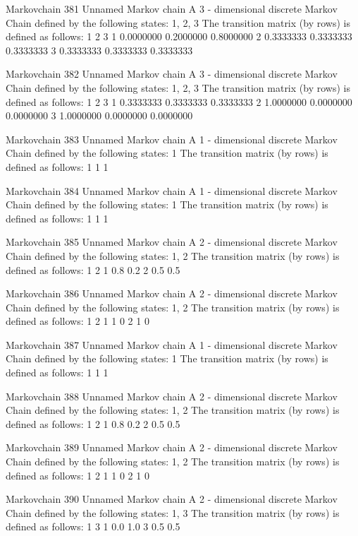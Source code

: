 \documentclass[
  nojss]{jss}
\begin{document}
\begin{CodeChunk}
\begin{CodeOutput}
Markovchain  381 
Unnamed Markov chain 
 A  3 - dimensional discrete Markov Chain defined by the following states: 
 1, 2, 3 
 The transition matrix  (by rows)  is defined as follows: 
          1         2         3
1 0.0000000 0.2000000 0.8000000
2 0.3333333 0.3333333 0.3333333
3 0.3333333 0.3333333 0.3333333

Markovchain  382 
Unnamed Markov chain 
 A  3 - dimensional discrete Markov Chain defined by the following states: 
 1, 2, 3 
 The transition matrix  (by rows)  is defined as follows: 
          1         2         3
1 0.3333333 0.3333333 0.3333333
2 1.0000000 0.0000000 0.0000000
3 1.0000000 0.0000000 0.0000000

Markovchain  383 
Unnamed Markov chain 
 A  1 - dimensional discrete Markov Chain defined by the following states: 
 1 
 The transition matrix  (by rows)  is defined as follows: 
  1
1 1

Markovchain  384 
Unnamed Markov chain 
 A  1 - dimensional discrete Markov Chain defined by the following states: 
 1 
 The transition matrix  (by rows)  is defined as follows: 
  1
1 1

Markovchain  385 
Unnamed Markov chain 
 A  2 - dimensional discrete Markov Chain defined by the following states: 
 1, 2 
 The transition matrix  (by rows)  is defined as follows: 
    1   2
1 0.8 0.2
2 0.5 0.5

Markovchain  386 
Unnamed Markov chain 
 A  2 - dimensional discrete Markov Chain defined by the following states: 
 1, 2 
 The transition matrix  (by rows)  is defined as follows: 
  1 2
1 1 0
2 1 0

Markovchain  387 
Unnamed Markov chain 
 A  1 - dimensional discrete Markov Chain defined by the following states: 
 1 
 The transition matrix  (by rows)  is defined as follows: 
  1
1 1

Markovchain  388 
Unnamed Markov chain 
 A  2 - dimensional discrete Markov Chain defined by the following states: 
 1, 2 
 The transition matrix  (by rows)  is defined as follows: 
    1   2
1 0.8 0.2
2 0.5 0.5

Markovchain  389 
Unnamed Markov chain 
 A  2 - dimensional discrete Markov Chain defined by the following states: 
 1, 2 
 The transition matrix  (by rows)  is defined as follows: 
  1 2
1 1 0
2 1 0

Markovchain  390 
Unnamed Markov chain 
 A  2 - dimensional discrete Markov Chain defined by the following states: 
 1, 3 
 The transition matrix  (by rows)  is defined as follows: 
    1   3
1 0.0 1.0
3 0.5 0.5


\end{CodeOutput}
\end{CodeChunk}
\end{document}
